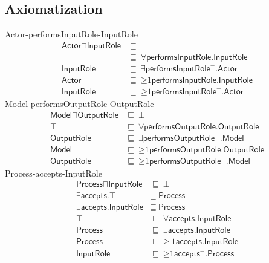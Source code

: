 \subsection{Axiomatization}
\label{axs:1c}
\textsf{Actor}-\textsf{performsInputRole}-\textsf{InputRole}
\begin{align}
\textsf{Actor} \sqcap \textsf{InputRole} &\sqsubseteq~\bot \\ %
\textsf{$\top$} &\sqsubseteq~\forall\textsf{performsInputRole.InputRole} \\ %
\textsf{InputRole} &\sqsubseteq~\exists\textsf{performsInputRole}^-\textsf{.Actor} \\ %
\textsf{Actor} &\sqsubseteq~\mathord{\geq}1\textsf{performsInputRole.InputRole} \\ %
\textsf{InputRole} &\sqsubseteq~\mathord{\geq}1\textsf{performsInputRole}^-\textsf{.Actor} %
\end{align}
\textsf{Model}-\textsf{performsOutputRole}-\textsf{OutputRole}
\begin{align}
    \textsf{Model} \sqcap \textsf{OutputRole} &\sqsubseteq~\bot \\ %
    \textsf{$\top$} &\sqsubseteq~\forall\textsf{performsOutputRole.OutputRole} \\ %
    \textsf{OutputRole} &\sqsubseteq~\exists\textsf{performsOutputRole}^-\textsf{.Model} \\ %
    \textsf{Model} &\sqsubseteq~\mathord{\geq}1\textsf{performsOutputRole.OutputRole} \\ %
    \textsf{OutputRole} &\sqsubseteq~\mathord{\geq}1\textsf{performsOutputRole}^-\textsf{.Model} %
\end{align}
\textsf{Process}-\textsf{accepts}-\textsf{InputRole}
\begin{align}
    \textsf{Process} \sqcap \textsf{InputRole} &\sqsubseteq~\bot \\ %
    \exists\textsf{accepts.$\top$} &\sqsubseteq~\textsf{Process} \\ %
    \exists\textsf{accepts.InputRole} &\sqsubseteq~\textsf{Process} \\ %
    \textsf{$\top$} &\sqsubseteq~\forall\textsf{accepts.InputRole} \\ %
    \textsf{Process} &\sqsubseteq~\exists\textsf{accepts.InputRole} \\ %
    \textsf{Process} &\sqsubseteq~\mathord{\geq}~1\textsf{accepts.InputRole} \\ %
    \textsf{InputRole} &\sqsubseteq~\mathord{\geq}1 \textsf{accepts}^-\textsf{.Process} %
\end{align}
